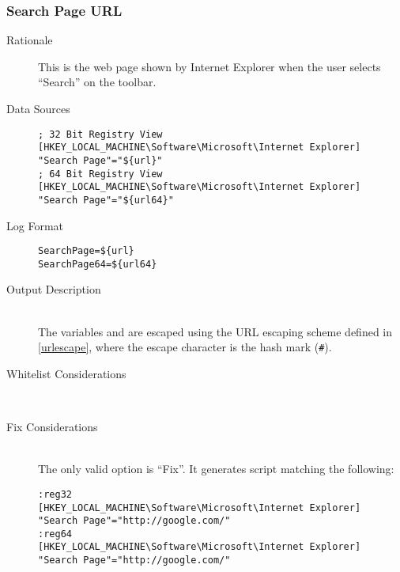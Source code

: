 \subsubsection{Search Page URL}
\begin{description}
\item[Rationale] This is the web page shown by Internet Explorer when the user
selects ``Search'' on the toolbar.

\item[Data Sources] \hfill
\vspace{-\baselineskip}
\begin{verbatim}
; 32 Bit Registry View
[HKEY_LOCAL_MACHINE\Software\Microsoft\Internet Explorer]
"Search Page"="${url}"
; 64 Bit Registry View
[HKEY_LOCAL_MACHINE\Software\Microsoft\Internet Explorer]
"Search Page"="${url64}"
\end{verbatim}
\item[Log Format] \hfill
\vspace{-\baselineskip}
\begin{verbatim} 
SearchPage=${url}
SearchPage64=${url64}
\end{verbatim}
\item[Output Description] \hfill \\
The variables  and  are escaped using the URL escaping
scheme defined in \ref{urlescape}, where the escape character is the hash mark
(\verb|#|).
\item[Whitelist Considerations] \hfill \\

\item[Fix Considerations] \hfill \\
The only valid option is ``Fix''. It generates script matching the following:
\vspace{-\baselineskip}
\begin{verbatim}
:reg32
[HKEY_LOCAL_MACHINE\Software\Microsoft\Internet Explorer]
"Search Page"="http://google.com/"
:reg64
[HKEY_LOCAL_MACHINE\Software\Microsoft\Internet Explorer]
"Search Page"="http://google.com/"
\end{verbatim}
\end{description}

